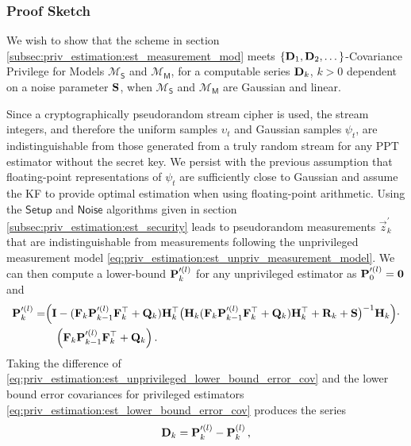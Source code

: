 \subsubsection{Proof Sketch}
We wish to show that the scheme in section \ref{subsec:priv_estimation:est_measurement_mod} meets $\{{{\mathbf{D}}}_1,{{\mathbf{D}}}_2,\dots\}$-Covariance Privilege for Models $\mathcal{M}_{\mathsf{S}}$ and $\mathcal{M}_{\mathsf{M}}$, for a computable series ${{\mathbf{D}}}_k$, $k>0$ dependent on a noise parameter ${{\mathbf{S}}}$, when $\mathcal{M}_{\mathsf{S}}$ and $\mathcal{M}_{\mathsf{M}}$ are Gaussian and linear. 

Since a cryptographically pseudorandom stream cipher is used, the stream integers, and therefore the uniform samples $\upsilon_t$ and Gaussian samples $\psi_t$, are indistinguishable from those generated from a truly random stream for any PPT estimator without the secret key. We persist with the previous assumption that floating-point representations of $\psi_t$ are sufficiently close to Gaussian and assume the KF to provide optimal estimation when using floating-point arithmetic. Using the $\mathsf{Setup}$ and $\mathsf{Noise}$ algorithms given in section \ref{subsec:priv_estimation:est_security} leads to pseudorandom measurements $\vec{z}^\prime_k$ that are indistinguishable from measurements following the unprivileged measurement model \eqref{eq:priv_estimation:est_unpriv_measurement_model}. We can then compute a lower-bound ${{\mathbf{P}}}_k^{\prime(l)}$ for any unprivileged estimator as ${{\mathbf{P}}}_0^{\prime(l)}={{\mathbf{0}}}$ and
\begin{equation}\label{eq:priv_estimation:est_unprivileged_lower_bound_error_cov}
   \begin{split}
      {\ensuremath{{\mathbf{P}}}}_k^{\prime(l)} =& \Bigl( {{\mathbf{I}}} - ({{\mathbf{F}}}_k{{\mathbf{P}}}_{k-1}^{\prime(l)}{{\mathbf{F}}}_k^\top + {{\mathbf{Q}}}_k){{\mathbf{H}}}_k^\top\bigl({{\mathbf{H}}}_k({{\mathbf{F}}}_k{{\mathbf{P}}}_{k-1}^{\prime(l)}{{\mathbf{F}}}_k^\top + {{\mathbf{Q}}}_k){{\mathbf{H}}}_k^\top + {{\mathbf{R}}}_k+{{\mathbf{S}}}\bigr)^{-1}{{\mathbf{H}}}_k\Bigr)\cdot\\
      &\quad\Bigl({{\mathbf{F}}}_k{{\mathbf{P}}}_{k-1}^{\prime(l)}{{\mathbf{F}}}_k^\top + {{\mathbf{Q}}}_k\Bigr)\,.
   \end{split}
\end{equation}
Taking the difference of \eqref{eq:priv_estimation:est_unprivileged_lower_bound_error_cov} and the lower bound error covariances for privileged estimators \eqref{eq:priv_estimation:est_lower_bound_error_cov} produces the series
\begin{equation}\label{eq:priv_estimation:est_covariance_difference_series}
   {\ensuremath{{\mathbf{D}}}}_k = {{\mathbf{P}}}_k^{\prime(l)} - {{\mathbf{P}}}_k^{(l)}\,,
\end{equation}
